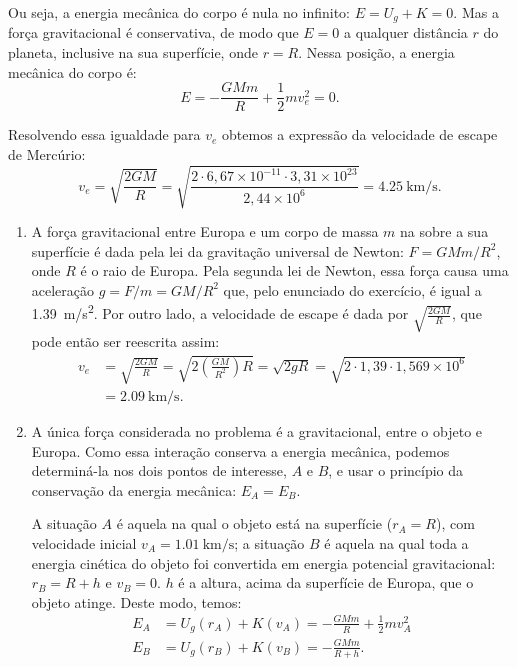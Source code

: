 \documentclass[a4paper]{article}
\begin{document}
\begin{resolucoes}
\begin{exercicio}
  Ou seja, a energia mecânica do corpo é nula no infinito: $E = U_g + K = 0$.
  Mas a força gravitacional é conservativa, de modo que $E = 0$ a qualquer distância $r$ do planeta, inclusive na sua superfície, onde $r = R$.
  Nessa posição, a energia mecânica do corpo é:
  \begin{equation*}
  E = -\frac{GMm}{R} + \frac{1}{2}mv_e^2 = 0.
  \end{equation*}
  
  Resolvendo essa igualdade para $v_e$ obtemos a expressão da velocidade de escape de Mercúrio:
  \begin{equation*}
  v_e = \sqrt{\frac{2GM}{R}} = \sqrt{\frac{ 2 \cdot 6,67\times10^{-11} \cdot 3,31\times10^{23} }{2,44 \times10^{6}}} = \SI{4.25}{\kilo\metre\per\second}.
  \end{equation*}
  \end{exercicio}
  
  \begin{exercicio}
  
  \begin{enumerate}
  \item A força gravitacional entre Europa e um corpo de massa $m$ na sobre a sua superfície é dada pela lei da gravitação universal de Newton: $F = GMm/R^2$, onde $R$ é o raio de Europa.
  Pela segunda lei de Newton, essa força causa uma aceleração $g = F/m = GM/R^2$ que, pelo enunciado do exercício, é igual a \SI{1.39}{m/s^2}.
  Por outro lado, a velocidade de escape é dada por $\sqrt{\frac{2GM}{R}}$, que pode então ser reescrita assim:
  \begin{align*}
  v_e &= \sqrt{\frac{2GM}{R}} = \sqrt{2\left(\frac{GM}{R^2}\right)R} = \sqrt{2gR} = \sqrt{2\cdot1,39\cdot 1,569\times10^6}\\
      &= \SI{2.09}{\kilo\metre\per\second}.
  \end{align*}
  
  \item A única força considerada no problema é a gravitacional, entre o objeto e Europa.
  Como essa interação conserva a energia mecânica, podemos determiná-la nos dois pontos de interesse, $A$ e $B$, e usar o princípio da conservação da energia mecânica: $E_A = E_B$.

  A situação $A$ é aquela na qual o objeto está na superfície ($r_A = R$), com velocidade inicial $v_A = \SI{1.01}{\kilo\metre\per\second}$;
  a situação $B$ é aquela na qual toda a energia cinética do objeto foi convertida em energia potencial gravitacional: $r_B = R + h$ e $v_B = 0$.
  $h$ é a altura, acima da superfície de Europa, que o objeto atinge.
  Deste modo, temos:
  \begin{align*}
  E_A &= U_g(r_A) + K(v_A) = -\frac{GMm}{R} + \frac{1}{2}mv_A^2 \\
  E_B &= U_g(r_B) + K(v_B) = -\frac{GMm}{R+h}.
  \end{align*}
  

\end{enumerate}
\end{exercicio}
\end{resolucoes}
\end{document}
